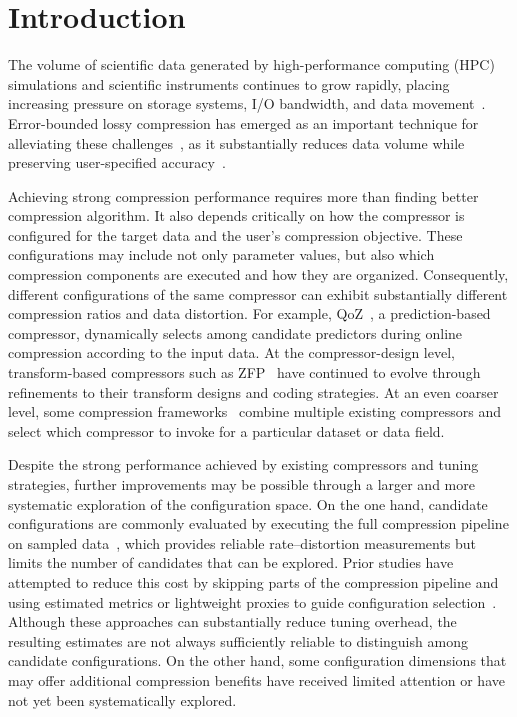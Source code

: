 \section{Introduction}

The volume of scientific data generated by high-performance computing (HPC) simulations and scientific instruments continues to grow rapidly, placing increasing pressure on storage systems, I/O bandwidth, and data movement~\cite{lockwood2017storage,huang2023towards,lewis2025machine,giannakou2024understanding,lockwood2019understanding}. Error-bounded lossy compression has emerged as an important technique for alleviating these challenges~\cite{cappello2019use,di2025survey,cappello2025support}, as it substantially reduces data volume while preserving user-specified accuracy~\cite{lindstrom2014fixed,di2016fast,huang2023cuszp,gong2023mgard,li2023lossy}.

Achieving strong compression performance requires more than finding better compression algorithm. It also depends critically on how the compressor is configured for the target data and the user’s compression objective. These configurations may include not only parameter values, but also which compression components are executed and how they are organized. Consequently, different configurations of the same compressor can exhibit substantially different compression ratios and data distortion. For example, QoZ~\cite{liu2022dynamic,liu2024high}, a prediction-based compressor, dynamically selects among candidate predictors during online compression according to the input data. At the compressor-design level, transform-based compressors such as ZFP~\cite{lindstrom2014fixed,diffenderfer2019error} have continued to evolve through refinements to their transform designs and coding strategies. At an even coarser level, some compression frameworks~\cite{liang2019significantly} combine multiple existing compressors and select which compressor to invoke for a particular dataset or data field.

Despite the strong performance achieved by existing compressors and tuning strategies, further improvements may be possible through a larger and more systematic exploration of the configuration space. On the one hand, candidate configurations are commonly evaluated by executing the full compression pipeline on sampled data~\cite{liang2022sz3,zhao2021optimizing}, which provides reliable rate–distortion measurements but limits the number of candidates that can be explored. Prior studies have attempted to reduce this cost by skipping parts of the compression pipeline and using estimated metrics or lightweight proxies to guide configuration selection~\cite{liang2019significantly,jin2022improving,liu2022dynamic,liu2021improving,liu2024high}. Although these approaches can substantially reduce tuning overhead, the resulting estimates are not always sufficiently reliable to distinguish among candidate configurations. On the other hand, some configuration dimensions that may offer additional compression benefits have received limited attention or have not yet been systematically explored.

